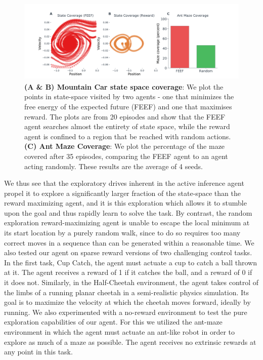 \begin{figure}[h]
   \centering 
   \includegraphics[width=12cm, height=4cm]{chapter_4_figures/RLAI_figure_two.pdf}
\caption{\textbf{(A \& B) Mountain Car state space coverage}: We plot the points in state-space visited by two agents - one that minimizes the free energy of the expected future (FEEF) and one that maximises reward. The plots are from 20 episodes and show that the FEEF agent searches almost the entirety of state space, while the reward agent is confined to a region that be reached with random actions. \textbf{(C) Ant Maze Coverage}: We plot the percentage of the maze covered after 35 episodes, comparing the FEEF agent to an agent acting randomly. These results are the average of 4 seeds.}
\end{figure}


We thus see that the exploratory drives inherent in the active inference agent propel it to explore a significantly larger fraction of the state-space than the reward maximizing agent, and it is this exploration which allows it to stumble upon the goal and thus rapidly learn to solve the task. By contrast, the random exploration reward-maximizing agent is unable to escape the local minimum at its start location by a purely random walk, since to do so requires too many correct moves in a sequence than can be generated within a reasonable time.
We also tested our agent on sparse reward versions of two challenging control tasks. In the first task, Cup Catch, the agent must actuate a cup to catch a ball thrown at it. The agent receives a reward of 1 if it catches the ball, and a reward of 0 if it does not. Similarly, in the Half-Cheetah environment, the agent takes control of the limbs of a running planar cheetah in a semi-realistic physics simulation. Its goal is to maximize the velocity at which the cheetah moves forward, ideally by running. We also experimented with a no-reward environment to test the pure exploration capabilities of our agent. For this we utilized the ant-maze environment in which the agent must actuate an ant-like robot in order to explore as much of a maze as possible. The agent receives no extrinsic rewards at any point in this task.


